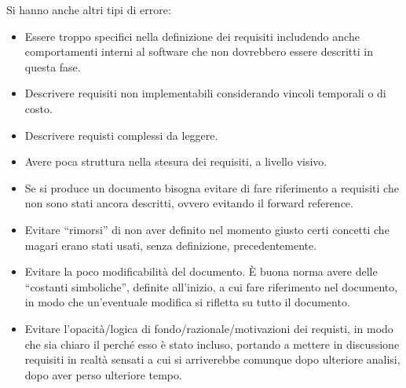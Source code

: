 Si hanno anche altri tipi di errore:
\begin{itemize}
      \item Essere troppo specifici nella definizione dei requisiti includendo
            anche comportamenti interni al software che non dovrebbero essere descritti
            in questa fase.
      \item Descrivere requisiti non implementabili considerando vincoli temporali
            o di costo.
      \item Descrivere requisti complessi da leggere.
      \item Avere poca struttura nella stesura dei requisiti, a livello visivo.
      \item Se si produce un documento bisogna evitare di fare riferimento a
            requisiti che non sono stati ancora descritti, ovvero evitando il forward
            reference.
      \item Evitare “rimorsi” di non aver definito nel momento giusto certi concetti
            che magari erano stati usati, senza definizione, precedentemente.
      \item Evitare la poco modificabilità del documento. È buona norma avere delle
            “costanti simboliche”, definite all'inizio, a cui fare riferimento nel documento,
            in modo che un'eventuale modifica si rifletta su tutto il documento.
      \item Evitare l'opacità/logica di fondo/razionale/motivazioni dei requisti,
            in modo che sia chiaro il perché esso è stato incluso, portando a mettere in
            discussione requisiti in realtà sensati a cui si arriverebbe comunque dopo
            ulteriore analisi, dopo aver perso ulteriore tempo.
\end{itemize}
